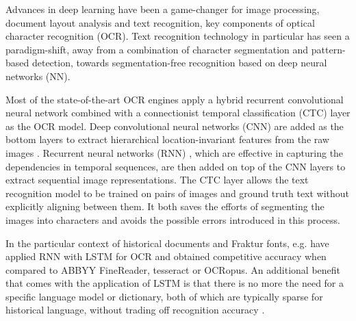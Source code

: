 \documentclass[sigconf]{acmart}
\begin{document}
Advances in deep learning have been a game-changer for image
processing, document layout analysis and text recognition, key components of optical
character recognition (OCR). Text recognition technology in
particular has seen a paradigm-shift, away from a combination of character
segmentation and pattern-based detection, towards
segmentation-free recognition based on deep neural networks (NN).

Most of the state-of-the-art OCR engines apply a hybrid recurrent convolutional
neural network combined with a connectionist temporal classification (CTC)
\cite{graves2006connectionist} layer as the OCR model. Deep convolutional
neural networks (CNN) \cite{krizhevsky2012imagenet} are added as the bottom
layers to extract hierarchical location-invariant features from the raw images
\cite{wick2018improving}. Recurrent neural networks (RNN)
\cite{mikolov2010recurrent}, which are effective in capturing the dependencies
in temporal sequences, are then added on top of the CNN layers to extract
sequential image representations. The CTC layer allows the text recognition
model to be trained on pairs of images and ground truth text without explicitly
aligning between them. It both saves the efforts of segmenting the images into
characters and avoids the possible errors introduced in this process.

In the particular context of historical documents and Fraktur fonts, e.g.
\cite{breuel2013high} have applied RNN with LSTM for OCR and obtained 
competitive accuracy when compared to ABBYY FineReader, tesseract or OCRopus. 
An additional benefit that comes with the application of LSTM is that there is
no more the need for a specific language model or dictionary, both of which are 
typically sparse for historical language, without trading off recognition accuracy \cite{ul2013can}.
\end{document}
